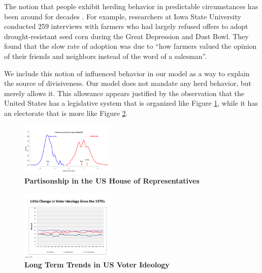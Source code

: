 The notion that people exhibit herding behavior in predictable circumstances has been around for decades \cite{shiller1995conversation}.  For example, researchers at Iowa State University conducted 259 interviews with farmers who had largely refused offers to adopt drought-resistant seed corn during the Great Depression and Dust Bowl.  They found that the slow rate of adoption was due to ``how farmers valued the opinion of their friends and neighbors instead of the word of a salesman''\cite{beal1957diffusion}.



We include this notion of influenced behavior in our model as a way to explain the source of divisiveness.  Our model does not mandate any herd behavior, but merely allows it.  This allowance appears justified by the observation that the United States has a legislative system that is organized like Figure \ref{fig:partisonship}, while it has an electorate that is more like Figure \ref{fig:voters}.


\begin{figure}[htbp]
\begin{center}
\includegraphics[width=0.4\textwidth]{figs/alpha_House_114_Histogram_8_January_2016}
\caption{{\bf Partisonship in the US House of Representatives}}
\label{fig:partisonship}
\end{center}
\end{figure}




\begin{figure}[htbp]
\begin{center}
\includegraphics[width=0.4\textwidth]{figs/polarization2}
\caption{{\bf Long Term Trends in US Voter Ideology}}
\label{fig:voters}
\end{center}
\end{figure}



